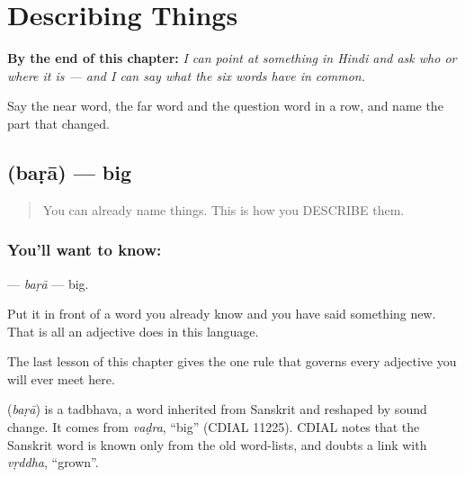 
\chapter{Describing Things}
\label{ch:hi-describing-things}

\begin{chapteropening}
\textbf{By the end of this chapter:} \emph{I can point at something in Hindi and ask who or where it is — and I can say what the six words have in common.}

Say the near word, the far word and the question word in a row, and name the part that changed.
\end{chapteropening}

\section[\texorpdfstring{\hi{बड़ा} (baṛā)}{बड़ा (baṛā)}]{ (baṛā) — big}

\label{lesson:HI-C41-big}



\begin{quote}
You can already name things. This is how you DESCRIBE them.
\end{quote}

\subsection*{You'll want to know: }
\textbf{} — \emph{baṛā} — big.

Put it in front of a word you already know and you have said something new. That is all an adjective does in this language.

The last lesson of this chapter gives the one rule that governs every adjective you will ever meet here.

\begin{cousinweb}
\textbf{} (\emph{baṛā}) is a tadbhava, a word inherited from Sanskrit and reshaped by sound change. It comes from \emph{vaḍra}, \textquotedblleft{}big\textquotedblright{} (CDIAL 11225). CDIAL notes that the Sanskrit word is known only from the old word-lists, and doubts a link with \emph{vṛddha}, \textquotedblleft{}grown\textquotedblright{}.
\end{cousinweb}

